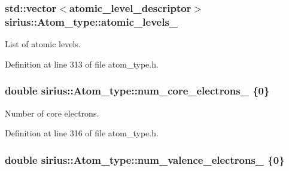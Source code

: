 \subsubsection[{atomic\+\_\+levels\+\_\+}]{\setlength{\rightskip}{0pt plus 5cm}std\+::vector$<${\bf atomic\+\_\+level\+\_\+descriptor}$>$ sirius\+::\+Atom\+\_\+type\+::atomic\+\_\+levels\+\_\+\hspace{0.3cm}{\ttfamily [private]}}\label{classsirius_1_1_atom__type_a0cdf5c6087f404ca30ce1601a57c5db8}


List of atomic levels. 



Definition at line 313 of file atom\+\_\+type.\+h.

\hypertarget{classsirius_1_1_atom__type_a82db9b4154e9e293353036e2b7c901ab}{}
\subsubsection[{num\+\_\+core\+\_\+electrons\+\_\+}]{\setlength{\rightskip}{0pt plus 5cm}double sirius\+::\+Atom\+\_\+type\+::num\+\_\+core\+\_\+electrons\+\_\+ \{0\}\hspace{0.3cm}{\ttfamily [private]}}\label{classsirius_1_1_atom__type_a82db9b4154e9e293353036e2b7c901ab}


Number of core electrons. 



Definition at line 316 of file atom\+\_\+type.\+h.

\hypertarget{classsirius_1_1_atom__type_afa5cc846e55d43ea12344f8130da0e0e}{}
\subsubsection[{num\+\_\+valence\+\_\+electrons\+\_\+}]{\setlength{\rightskip}{0pt plus 5cm}double sirius\+::\+Atom\+\_\+type\+::num\+\_\+valence\+\_\+electrons\+\_\+ \{0\}\hspace{0.3cm}{\ttfamily [private]}}\label{classsirius_1_1_atom__type_afa5cc846e55d43ea12344f8130da0e0e}


